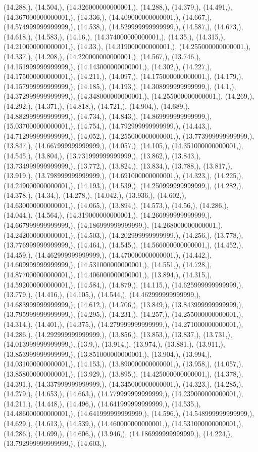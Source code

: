 \documentclass{article}
\begin{document}
(14.288,), (14.504,), (14.326000000000001,), (14.288,), (14.379,), (14.491,), (14.367000000000001,), (14.336,), (14.409000000000001,), (14.667,), (14.574999999999999,), (14.538,), (14.529999999999999,), (14.587,), (14.673,), (14.618,), (14.583,), (14.16,), (14.374000000000001,), (14.35,), (14.315,), (14.210000000000001,), (14.33,), (14.319000000000001,), (14.255000000000001,), (14.337,), (14.208,), (14.220000000000001,), (14.567,), (13.746,), (14.151999999999999,), (14.143000000000001,), (14.302,), (14.227,), (14.175000000000001,), (14.211,), (14.097,), (14.175000000000001,), (14.179,), (14.157999999999999,), (14.185,), (14.193,), (14.308999999999999,), (14.1,), (14.372999999999999,), (14.348000000000001,), (14.255000000000001,), (14.269,), (14.292,), (14.371,), (14.818,), (14.721,), (14.904,), (14.689,), (14.882999999999999,), (14.734,), (14.843,), (14.869999999999999,), (15.037000000000001,), (14.754,), (14.792999999999999,), (14.443,), (14.712999999999999,), (14.052,), (14.255000000000001,), (13.773999999999999,), (13.847,), (14.667999999999999,), (14.057,), (14.105,), (14.351000000000001,), (14.545,), (13.804,), (13.731999999999999,), (13.862,), (13.843,), (13.734999999999999,), (13.772,), (13.824,), (13.834,), (13.788,), (13.817,), (13.919,), (13.798999999999999,), (14.691000000000001,), (14.323,), (14.225,), (14.249000000000001,), (14.193,), (14.539,), (14.250999999999999,), (14.282,), (14.378,), (14.34,), (14.278,), (14.042,), (13.936,), (14.602,), (14.630000000000001,), (14.065,), (13.894,), (14.573,), (14.56,), (14.286,), (14.044,), (14.564,), (14.319000000000001,), (14.266999999999999,), (14.667999999999999,), (14.186999999999999,), (14.268000000000001,), (14.242000000000001,), (14.503,), (14.202999999999999,), (14.256,), (13.778,), (13.776999999999999,), (14.464,), (14.545,), (14.566000000000001,), (14.452,), (14.459,), (14.462999999999999,), (14.470000000000001,), (14.442,), (14.609999999999999,), (14.531000000000001,), (14.551,), (14.728,), (14.877000000000001,), (14.406000000000001,), (13.894,), (14.315,), (14.592000000000001,), (14.584,), (14.879,), (14.115,), (14.625999999999999,), (13.779,), (14.416,), (14.105,), (14.544,), (14.462999999999999,), (14.683999999999999,), (14.612,), (14.706,), (13.849,), (13.843999999999999,), (13.795999999999999,), (14.295,), (14.231,), (14.257,), (14.255000000000001,), (14.314,), (14.401,), (14.375,), (14.279999999999999,), (14.271000000000001,), (14.286,), (14.292999999999999,), (13.856,), (13.853,), (13.837,), (13.731,), (14.013999999999999,), (13.9,), (13.914,), (13.974,), (13.881,), (13.911,), (13.853999999999999,), (13.851000000000001,), (13.904,), (13.994,), (14.031000000000001,), (14.153,), (13.890000000000001,), (13.958,), (14.057,), (13.858000000000001,), (13.929,), (13.895,), (14.425000000000001,), (14.378,), (14.391,), (14.337999999999999,), (14.345000000000001,), (14.323,), (14.285,), (14.279,), (14.653,), (14.663,), (14.779999999999999,), (14.239000000000001,), (14.211,), (14.448,), (14.496,), (14.641999999999999,), (14.535,), (14.486000000000001,), (14.641999999999999,), (14.596,), (14.548999999999999,), (14.629,), (14.613,), (14.539,), (14.460000000000001,), (14.531000000000001,), (14.286,), (14.699,), (14.606,), (13.946,), (14.186999999999999,), (14.224,), (13.792999999999999,), (14.603,), 
\end{document}
